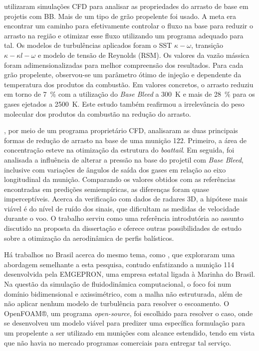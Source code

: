\cite{Dali2018a} utilizaram simulações CFD para analisar as propriedades do arrasto de base em projetis com BB. Mais de um tipo de grão propelente foi usado. A meta era encontrar um caminho para efetivamente controlar o fluxo na base para reduzir o arrasto na região e otimizar esse fluxo utilizando um programa adequado para tal. Os modelos de turbulências aplicados foram o SST \(\kappa-\omega\), transição \(\kappa-\kappa l-\omega\) e modelo de tensão de Reynolds (RSM). Os valores da vazão mássica foram adimensionalizadas para melhor compreensão dos resultados. Para cada grão propelente, observou-se um parâmetro ótimo de injeção e dependente da temperatura dos produtos da combustão. Em valores concretos, o arrasto reduziu em torno de \qty{7}{\percent} com a utilização do \textit{Base Bleed} a \qty{300}{\kelvin} e mais de \qty{28}{\percent} para os gases ejetados a \qty{2500}{\kelvin}. Este estudo também reafirmou a irrelevância do peso molecular dos produtos da combustão na redução do arrasto.
	
\cite{Dali2018b}, por meio de um programa proprietário CFD, analisaram as duas principais formas de redução de arrasto na base de uma munição \qty{122}{\millimetre}. Primeiro, a área de concentração esteve na otimização da estrutura do \textit{boattail}. Em seguida, foi analisada a influência de alterar a pressão na base do projetil com \textit{Base Bleed}, inclusive com variações de ângulos de saída dos gases em relação ao eixo longitudinal da munição. Comparando os valores obtidos com as referências encontradas em predições semiempíricas, as diferenças foram quase imperceptíveis. Acerca da verificação com dados de radares 3D, a hipótese mais viável é do nível de ruído dos sinais, que dificultam as medidas de velocidade durante o voo. O trabalho serviu como uma referência introdutória ao assunto discutido na proposta da dissertação e oferece outras possibilidades de estudo sobre a otimização da aerodinâmica de perfis balísticos. 
	
Há trabalhos no Brasil acerca do mesmo tema, como \cite{Lucena2020,Rosendo2020,Gil2020}, que exploraram uma abordagem semelhante a esta pesquisa, contudo enfatizando a munição \qty{114}{\millimetre} desenvolvida pela EMGEPRON, uma empresa estatal ligada à Marinha do Brasil. Na questão da simulação de fluidodinâmica computacional, o foco foi num domínio bidimensional e axissimétrico, com a malha não estruturada, além de não aplicar nenhum modelo de turbulência para resolver o escoamento. O OpenFOAM®, um programa \textit{open-source}, foi escolhido para resolver o caso, onde se desenvolveu um modelo viável para predizer uma específica formulação para um propelente a ser utilizado em munições com alcance estendido, tendo em vista que não havia no mercado programas comerciais para entregar tal serviço. 

